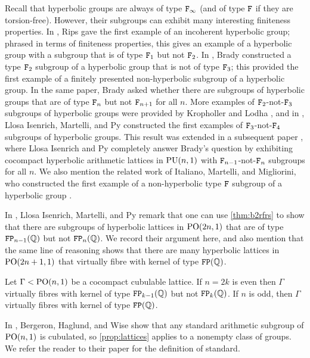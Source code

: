 \documentclass[11pt, letterpaper]{amsart}
\begin{document}
Recall that hyperbolic groups are always of type $\mathtt{F}_\infty$ (and of type $\mathtt{F}$ if they are torsion-free). However, their subgroups can exhibit many interesting finiteness properties. In \cite{RipsF1notF2_1982}, Rips gave the first example of an incoherent hyperbolic group; phrased in terms of finiteness properties, this gives an example of a hyperbolic group with a subgroup that is of type $\mathtt{F}_1$ but not $\mathtt{F}_2$. In \cite{BradyF2notF3_1999}, Brady constructed a type $\mathtt{F}_2$ subgroup of a hyperbolic group that is not of type $\mathtt{F}_3$; this provided the first example of a finitely presented non-hyperbolic subgroup of a hyperbolic group. In the same paper, Brady asked whether there are subgroups of hyperbolic groups that are of type $\mathtt{F}_n$ but not $\mathtt{F}_{n+1}$ for all $n$. More examples of $\mathtt{F}_2$-not-$\mathtt{F}_3$ subgroups of hyperbolic groups were provided by Kropholler \cite{KrophollerF2notF3} and Lodha \cite{LodhaF_2notF_3}, and in \cite{isenrich2021hyperbolic}, Llosa Isenrich, Martelli, and Py constructed the first examples of $\mathtt{F}_3$-not-$\mathtt{F}_4$ subgroups of hyperbolic groups. This result was extended in a subsequent paper \cite{IsenrichPy2022}, where Llosa Isenrich and Py completely answer Brady's question by exhibiting cocompact hyperbolic arithmetic lattices in $\mathrm{PU}(n,1)$ with $\mathtt{F}_{n-1}$-not-$\mathtt{F}_n$ subgroups for all $n$. We also mention the related work of Italiano, Martelli, and Migliorini, who constructed the first example of a non-hyperbolic type $\mathtt{F}$ subgroup of a hyperbolic group \cite{IMM_5mfld}.

In \cite{isenrich2021hyperbolic}, Llosa Isenrich, Martelli, and Py remark that one can use \cref{thm:b2rfrs} to show that there are subgroups of hyperbolic lattices in $\mathrm{PO}(2n,1)$ that are of type $\mathtt{FP}_{n-1}(\mathbb{Q})$ but not $\mathtt{FP}_n(\mathbb{Q})$. We record their argument here, and also mention that the same line of reasoning shows that there are many hyperbolic lattices in $\mathrm{PO}(2n+1,1)$ that virtually fibre with kernel of type $\mathtt{FP}(\mathbb{Q})$.

\begin{prop}\label{prop:lattices}
    Let $\Gamma < \mathrm{PO}(n,1)$ be a cocompact cubulable lattice. If $n = 2k$ is even then $\Gamma$ virtually fibres with kernel of type $\mathtt{FP}_{k-1}(\mathbb{Q})$ but not $\mathtt{FP}_k(\mathbb{Q})$. If $n$ is odd, then $\Gamma$ virtually fibres with kernel of type $\mathtt{FP}(\mathbb{Q})$.
\end{prop}

\begin{rem}
    In \cite{BHW_2011}, Bergeron, Haglund, and Wise show that any standard arithmetic subgroup of $\mathrm{PO}(n,1)$ is cubulated, so \cref{prop:lattices} applies to a nonempty class of groups. We refer the reader to their paper for the definition of standard.
\end{rem}
\end{document}
